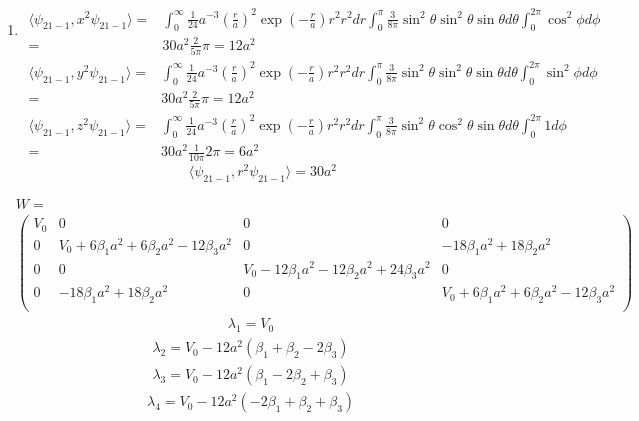 \begin{enumerate}
\begin{enumerate}
    \item 
    \begin{align*}
        \langle\psi_{21-1},x^2\psi_{21-1}\rangle=&
        \int_0^\infty 
        \frac{1}{24}
        a^{-3}
        \left(\frac{r}{a}\right)^2
        \exp(-\frac{r}{a})r^2r^2dr
        \int_0^\pi 
        \frac{3}{8\pi}
        \sin^2\theta 
        \sin^2\theta 
        \sin\theta d\theta 
        \int_0^{2\pi}
        \cos^2\phi 
         d\phi\\
        =&30a^2\frac{2}{5\pi}\pi = 12a^2
    \end{align*}
    \begin{align*}
        \langle\psi_{21-1},y^2\psi_{21-1}\rangle=&
        \int_0^\infty 
        \frac{1}{24}
        a^{-3}
        \left(\frac{r}{a}\right)^2
        \exp(-\frac{r}{a})r^2r^2dr
        \int_0^\pi 
        \frac{3}{8\pi}
        \sin^2\theta 
        \sin^2\theta 
        \sin\theta d\theta 
        \int_0^{2\pi}
        \sin^2\phi 
         d\phi\\
        =&30a^2\frac{2}{5\pi}\pi = 12a^2
    \end{align*}
    \begin{align*}
        \langle\psi_{21-1},z^2\psi_{21-1}\rangle=&
        \int_0^\infty 
        \frac{1}{24}
        a^{-3}
        \left(\frac{r}{a}\right)^2
        \exp(-\frac{r}{a})r^2r^2dr
        \int_0^\pi 
        \frac{3}{8\pi}
        \sin^2\theta 
        \cos^2\theta 
        \sin\theta d\theta 
        \int_0^{2\pi}
        1
         d\phi\\
        =&30a^2\frac{1}{10\pi}2\pi = 6a^2
    \end{align*}
    $$
    \langle\psi_{21-1},r^2\psi_{21-1}\rangle=30a^2
    $$

    \end{enumerate}
    
      
 \begin{align*}
     &W =\\
     &\begin{pmatrix}
         V_0 & 0 & 0  & 0\\
         0 & V_0+6\beta_1a^2+6\beta_2a^2-12\beta_3a^2 & 0  & -18\beta_1a^2+18\beta_2a^2\\
         0 & 0 & V_0-12\beta_1a^2-12\beta_2a^2+24\beta_3a^2 & 0\\
         0 & -18\beta_1a^2+18\beta_2a^2 & 0  & V_0+6\beta_1a^2+6\beta_2a^2-12\beta_3a^2\\
     \end{pmatrix}
 \end{align*}
 \begin{align*}
     \lambda_1 = V_0
 \end{align*}
 \begin{align*}
     \lambda_2 = V_0-12a^2(\beta_1+\beta_2-2\beta_3)
 \end{align*}
 \begin{align*}
     \lambda_3 =V_0-12a^2(\beta_1-2\beta_2+\beta_3)
 \end{align*}
 \begin{align*}
     \lambda_4 =V_0-12a^2(-2\beta_1+\beta_2+\beta_3)
 \end{align*}


\end{enumerate}
